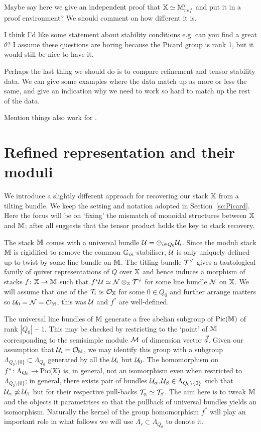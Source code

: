 \documentclass[12pt]{amsart}
\begin{document}
{\red Maybe say here we give an independent proof that $\mathbb{X} \simeq \mathbb{M}'_{ref}$ and put it in a proof environment? We should comment on how different it is.}

{\red I think I'd like some statement about stability conditions e.g. can you find a great $\theta$? I assume these questions are boring because the Picard group is rank 1, but it would still be nice to have it.}

{\red Perhaps the last thing we should do is to compare refinement and tensor stability data. We can give some examples where the data match up as more or less the same, and give an indication why we need to work so hard to match up the rest of the data.}

{\red Mention things also work for \cite{C17}.}

\section{Refined representation and their moduli}

We introduce a slightly different approach for recovering our stack $\mathbb{X}$ from a tilting bundle.
We keep the setting and notation adopted in Section~\ref{sc:Picard}.
Here the focus will be on `fixing' the mismatch of monoidal structures between $\mathbb{X}$ and $\mathbb{M}$; after all \cite{Lurie} suggests that the tensor product holds the key to stack recovery.

The stack $\mathbb{M}$ comes with a universal bundle $\mathcal{U}  = \oplus_{i \in Q_0} \mathcal{U}_i$.
Since the moduli stack $\mathbb{M}$ is rigidified to remove the common $\mathbb{G}_m$-stabiliser, $\mathcal{U}$ is only uniquely defined up to twist by some line bundle on $\mathbb{M}$.
The titling bundle $\mathcal{T}^{\vee}$ gives a tautological family of quiver representations of $Q$ over $\mathbb{X}$ and hence induces a morphism of stacks $f \colon \mathbb{X} \rightarrow \mathbb{M}$ such that $f^* \mathcal{U} \simeq \mathcal{N} \otimes_{\mathbb{X}} \mathcal{T}^{\vee}$ for some line bundle $\mathcal{N}$ on $\mathbb{X}$.
We will assume that one of the $\mathcal{T}_i$ is $\mathcal{O}_{\mathbb{X}}$ for some $0 \in Q_0$ and further arrange matters so $\mathcal{U}_0 = \mathcal{N} = \mathcal{O}_{\mathbb{M}}$, this was $\mathcal{U}$ and $f^*$ are well-defined.

The universal line bundles of $\mathbb{M}$ generate a free abelian subgroup of $\operatorname{Pic}(\mathbb{M})$ of rank $|Q_0|-1$.
This may be checked by restricting to the `point' of $\mathbb{M}$ corresponding to the semisimple module $\mathcal{M}$ of dimension vector ${\vec{d}}$.
Given our assumption that $\mathcal{U}_i = \mathcal{O}_{\mathbb{M}}$, we may identify this group with a subgroup $\Lambda_{Q_0 \setminus \{0\}} \subset \Lambda_{Q_0}$ generated by all the $\mathcal{U}_i$ but $\mathcal{U}_0$.
The homomorphism on $f^* \colon \Lambda_{Q_0} \rightarrow \operatorname{Pic}(\mathbb{X})$ is, in general, not an isomorphism even when restricted to $\Lambda_{Q_0 \setminus \{0\}}$; in general, there exists pair of bundles $\mathcal{U}_\alpha, \mathcal{U}_\beta \in \Lambda_{Q_0 \setminus \{0\}}$ such that $\mathcal{U}_\alpha \not\simeq \mathcal{U}_\beta$ but for their respective pull-backs $\mathcal{T}_\alpha \simeq \mathcal{T}_\beta$.
The aim here is to tweak $\mathbb{M}$ and the objects it parametrises so that the pullback of universal bundles yields an isomorphism.
Naturally the kernel of the group homomorphism $f^*$ will play an important role in what follows we will use $\Lambda_r \subset \Lambda_{Q_0}$ to denote it.
\end{document}
